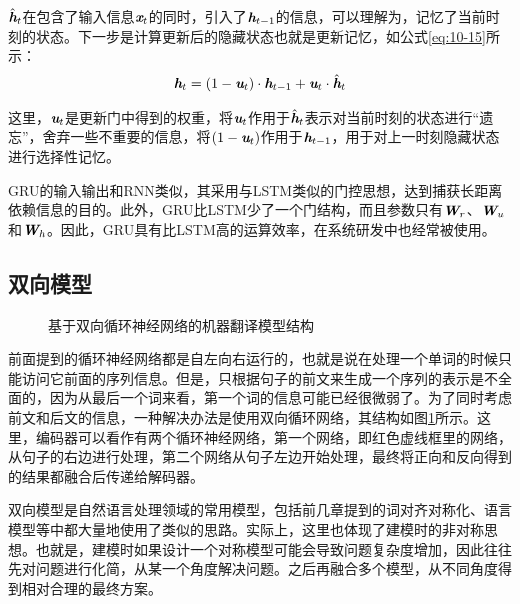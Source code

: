 \parinterval $\hat{\textbf{\em h}}_t$在包含了输入信息$\textbf{\em x}_t$的同时，引入了$\textbf{\em h}_{t-1}$的信息，可以理解为，记忆了当前时刻的状态。下一步是计算更新后的隐藏状态也就是更新记忆，如公式\eqref{eq:10-15}所示：
\vspace{-1em}
\begin{eqnarray}
\textbf{\em h}_t = (1-\textbf{\em u}_t) \cdot \textbf{\em h}_{t-1} +\textbf{\em u}_t \cdot \hat{\textbf{\em h}}_t
\label{eq:10-15}
\end{eqnarray}
\vspace{-1em}

\noindent 这里，$\textbf{\em u}_t$是更新门中得到的权重，将$\textbf{\em u}_t$作用于$\hat{\textbf{\em h}}_t$表示对当前时刻的状态进行“遗忘”，舍弃一些不重要的信息，将$(1-\textbf{\em u}_t)$作用于$\textbf{\em h}_{t-1}$，用于对上一时刻隐藏状态进行选择性记忆。

\parinterval GRU的输入输出和RNN类似，其采用与LSTM类似的门控思想，达到捕获长距离依赖信息的目的。此外，GRU比LSTM少了一个门结构，而且参数只有$\textbf{\em W}_r$、$\textbf{\em W}_u$和$\textbf{\em W}_h$。因此，GRU具有比LSTM高的运算效率，在系统研发中也经常被使用。


\subsection{双向模型}

\begin{figure}[htp]
\centering

\caption{基于双向循环神经网络的机器翻译模型结构}
\label{fig:10-14}
\end{figure}
\parinterval 前面提到的循环神经网络都是自左向右运行的，也就是说在处理一个单词的时候只能访问它前面的序列信息。但是，只根据句子的前文来生成一个序列的表示是不全面的，因为从最后一个词来看，第一个词的信息可能已经很微弱了。为了同时考虑前文和后文的信息，一种解决办法是使用双向循环网络，其结构如图\ref{fig:10-14}所示。这里，编码器可以看作有两个循环神经网络，第一个网络，即红色虚线框里的网络，从句子的右边进行处理，第二个网络从句子左边开始处理，最终将正向和反向得到的结果都融合后传递给解码器。

\parinterval 双向模型是自然语言处理领域的常用模型，包括前几章提到的词对齐对称化、语言模型等中都大量地使用了类似的思路。实际上，这里也体现了建模时的非对称思想。也就是，建模时如果设计一个对称模型可能会导致问题复杂度增加，因此往往先对问题进行化简，从某一个角度解决问题。之后再融合多个模型，从不同角度得到相对合理的最终方案。

